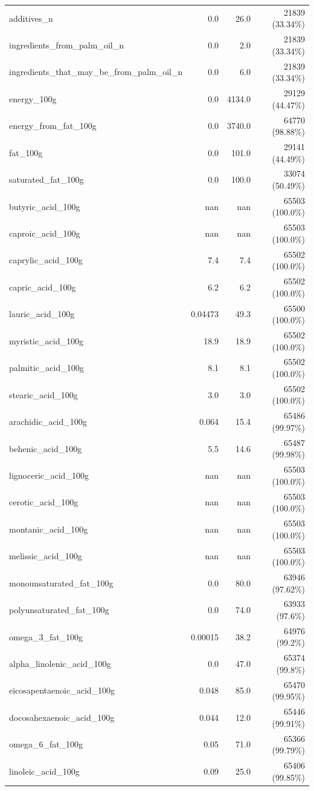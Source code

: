 \documentclass[11pt]{article}
\begin{document}
\begin{center}
\begin{longtable}{|l|r|r|r|}
additives\_n& 0.0& 26.0& 21839 (33.34\%)\\
ingredients\_from\_palm\_oil\_n& 0.0& 2.0& 21839 (33.34\%)\\
ingredients\_that\_may\_be\_from\_palm\_oil\_n& 0.0& 6.0& 21839 (33.34\%)\\
energy\_100g& 0.0& 4134.0& 29129 (44.47\%)\\
energy\_from\_fat\_100g& 0.0& 3740.0& 64770 (98.88\%)\\
fat\_100g& 0.0& 101.0& 29141 (44.49\%)\\
saturated\_fat\_100g& 0.0& 100.0& 33074 (50.49\%)\\
butyric\_acid\_100g& nan& nan& 65503 (100.0\%)\\
caproic\_acid\_100g& nan& nan& 65503 (100.0\%)\\
caprylic\_acid\_100g& 7.4& 7.4& 65502 (100.0\%)\\
capric\_acid\_100g& 6.2& 6.2& 65502 (100.0\%)\\
lauric\_acid\_100g& 0.04473& 49.3& 65500 (100.0\%)\\
myristic\_acid\_100g& 18.9& 18.9& 65502 (100.0\%)\\
palmitic\_acid\_100g& 8.1& 8.1& 65502 (100.0\%)\\
stearic\_acid\_100g& 3.0& 3.0& 65502 (100.0\%)\\
arachidic\_acid\_100g& 0.064& 15.4& 65486 (99.97\%)\\
behenic\_acid\_100g& 5.5& 14.6& 65487 (99.98\%)\\
lignoceric\_acid\_100g& nan& nan& 65503 (100.0\%)\\
cerotic\_acid\_100g& nan& nan& 65503 (100.0\%)\\
montanic\_acid\_100g& nan& nan& 65503 (100.0\%)\\
melissic\_acid\_100g& nan& nan& 65503 (100.0\%)\\
monounsaturated\_fat\_100g& 0.0& 80.0& 63946 (97.62\%)\\
polyunsaturated\_fat\_100g& 0.0& 74.0& 63933 (97.6\%)\\
omega\_3\_fat\_100g& 0.00015& 38.2& 64976 (99.2\%)\\
alpha\_linolenic\_acid\_100g& 0.0& 47.0& 65374 (99.8\%)\\
eicosapentaenoic\_acid\_100g& 0.048& 85.0& 65470 (99.95\%)\\
docosahexaenoic\_acid\_100g& 0.044& 12.0& 65446 (99.91\%)\\
omega\_6\_fat\_100g& 0.05& 71.0& 65366 (99.79\%)\\
linoleic\_acid\_100g& 0.09& 25.0& 65406 (99.85\%)\\

\end{longtable}
\end{center}
\end{document}
